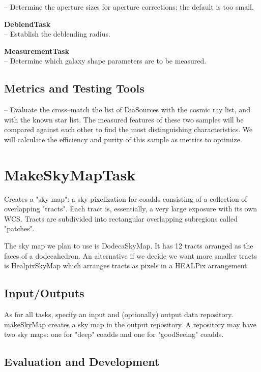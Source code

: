 \documentclass[12pt]{article}
\begin{document}
-- Determine the aperture sizes for aperture corrections; the default is too small.

{\bf DeblendTask}\\
-- Establish the deblending radius.

{\bf MeasurementTask}\\
-- Determine which galaxy shape parameters are to be measured.

\subsection{Metrics and Testing Tools}

-- Evaluate the cross--match the list of DiaSources  with the cosmic ray list, and
with the known star list.  The measured features of these two samples
will be compared against each other to find the most distinguishing
characteristics.  We will calculate the efficiency and purity of this
sample as metrics to optimize.


\clearpage 
\section{MakeSkyMapTask} 

Creates a "sky map": a sky pixelization for coadds consisting of a collection of overlapping "tracts".
Each tract is, essentially, a very large exposure with its own WCS.
Tracts are subdivided into rectangular overlapping subregions called "patches".

The sky map we plan to use is DodecaSkyMap. It has 12 tracts arranged as the faces of a dodecahedron.
An alternative if we decide we want more smaller tracts is HealpixSkyMap which arranges
tracts as pixels in a HEALPix arrangement.

\subsection{Input/Outputs}

As for all tasks, specify an input and (optionally) output data repository.
makeSkyMap creates a sky map in the output repository.
A repository may have two sky maps: one for "deep" coadds and one for "goodSeeing" coadds.

\subsection{Evaluation and Development}
\end{document}

